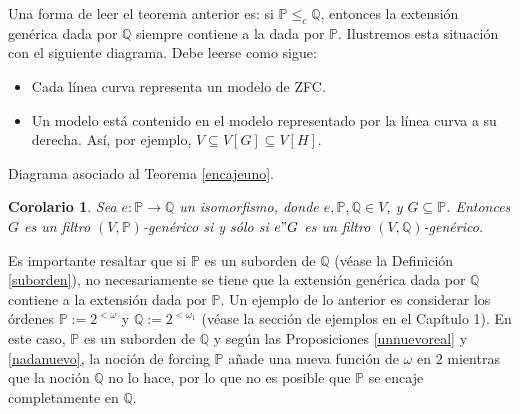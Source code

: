 \documentclass[11pt]{unam_tesis1}
\theoremstyle{MyThmStyle}
\theoremstyle{definition}
\theoremstyle{plain}
\newtheorem{corollary}[definition]{Corolario}
\theoremstyle{remark}
\let\leq\leqslant
\begin{document}
Una forma de leer el teorema anterior es: si $\mathbb P \leq_c \mathbb Q$, entonces la extensi\'on gen\'erica dada por $\mathbb Q$ siempre contiene a la dada por $\mathbb P$. Ilustremos esta situaci\'on con el siguiente diagrama. Debe leerse como sigue:

\begin{itemize}

\item[(i)] Cada l\'inea curva representa un modelo de ZFC. 
\item[(ii)] Un modelo est\'a contenido en el modelo representado por la l\'inea curva a su derecha. As\'i, por ejemplo, $V\subseteq V[G]\subseteq V[H]$.

\end{itemize}

\begin{center}

\centering

Diagrama asociado al Teorema \ref{encajeuno}.

\end{center}

\begin{corollary}
Sea $e:\mathbb P\to \mathbb Q$ un isomorfismo, donde $e,\mathbb P,\mathbb Q \in V$, y $G\subseteq \mathbb P$. Entonces $G$ es un filtro $(V,\mathbb P)$-gen\'erico si y s\'olo si $e"G$ es un filtro $(V,\mathbb Q)$-gen\'erico.

\end{corollary}

Es importante resaltar que si $\mathbb P$ es un suborden de $\mathbb Q$ (v\'ease la Definici\'on \ref{suborden}), no ne\-ce\-sa\-ria\-men\-te se tiene que la extensi\'on gen\'erica dada por $\mathbb Q$ contiene a la extensi\'on dada por $\mathbb P$. Un ejemplo de lo anterior es considerar los \'ordenes $\mathbb P:=2^{<\omega}$ y $\mathbb Q:=2^{<\omega_1}$ (v\'ease la secci\'on de ejemplos en el Cap\'itulo 1). En este caso, $\mathbb P$ es un suborden de $\mathbb Q$ y seg\'un las Proposiciones \ref{unnuevoreal} y \ref{nadanuevo}, la noci\'on de forcing $\mathbb P$ a\~nade una nueva funci\'on de $\omega$ en $2$ mientras que la noci\'on $\mathbb Q$ no lo hace, por lo que no es posible que $\mathbb P$ se encaje completamente en $\mathbb Q$.
\end{document}
